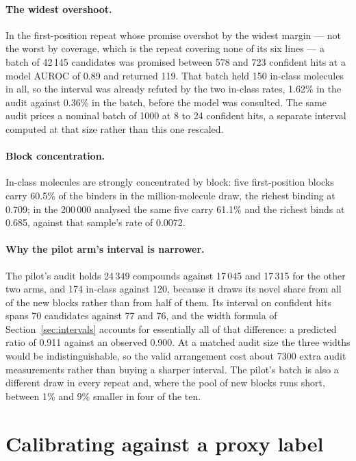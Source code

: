 \documentclass[10pt]{article}
\begin{document}
\paragraph{The widest overshoot.} In the first-position repeat whose promise overshot by the
widest margin --- not the worst by coverage, which is the repeat covering none of its six lines
--- a batch of 42\,145 candidates was promised between 578 and 723 confident hits at a model
AUROC of 0.89 and returned 119. That batch held 150 in-class molecules in all, so the interval
was already refuted by the two in-class rates, 1.62\% in the audit against 0.36\% in the batch,
before the model was consulted. The same audit prices a nominal batch of 1000 at 8 to 24
confident hits, a separate interval computed at that size rather than this one rescaled.

\paragraph{Block concentration.} In-class molecules are strongly concentrated by block: five
first-position blocks carry 60.5\% of the binders in the million-molecule draw, the richest
binding at 0.709; in the 200\,000 analysed the same five carry 61.1\% and the richest binds at
0.685, against that sample's rate of 0.0072.

\paragraph{Why the pilot arm's interval is narrower.} The pilot's audit holds 24\,349 compounds
against 17\,045 and 17\,315 for the other two arms, and 174 in-class against 120, because it
draws its novel share from all of the new blocks rather than from half of them. Its interval on
confident hits spans 70 candidates against 77 and 76, and the width formula of
Section~\ref{sec:intervals} accounts for essentially all of that difference: a predicted ratio of
0.911 against an observed 0.900. At a matched audit size the three widths would be
indistinguishable, so the valid arrangement cost about 7300 extra audit measurements rather than
buying a sharper interval. The pilot's batch is also a different draw in every repeat and,
where the pool of new blocks runs short, between 1\% and 9\% smaller in four of the ten.

\section{Calibrating against a proxy label}
\label{sec:surrogate}
\end{document}
